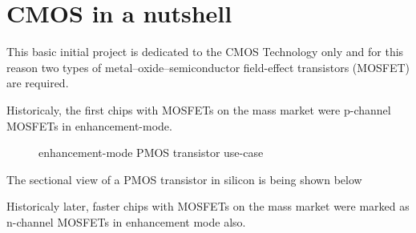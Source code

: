 \newpage
\section{CMOS in a nutshell}

This basic initial project is dedicated to the CMOS Technology only and for this reason two types of metal–oxide–semiconductor field-effect transistors (MOSFET) are required.

Historicaly, the first chips with MOSFETs on the mass market were p-channel MOSFETs in enhancement-mode.

\begin{center}
    \begin{figure}[h] \caption{enhancement-mode PMOS transistor use-case}
        \begin{circuitdiagram}[draft*]{20}{20}
        \end{circuitdiagram}
    \end{figure}
\end{center}

The sectional view of a PMOS transistor in silicon is being shown below
\begin{center}
\end{center}

Historicaly later, faster chips with MOSFETs on the mass market were marked as n-channel MOSFETs in enhancement mode also.

